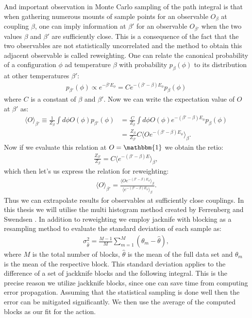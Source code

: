 \documentclass[english,twoside,openright]{UH_TCM_MSc}
\newcommand{\id}{\mathbbm{1}}
\begin{document}
And important observation in Monte Carlo sampling of the path integral is that when gathering numerous mounts of sample points for an observable $O_\beta$ at coupling $\beta$, one can imply information at $\beta'$ for an observable $O_{\beta'}$ when the two values $\beta$ and $\beta'$ are sufficiently close. This is a consequence of the fact that the two observables are not statistically uncorrelated and the method to obtain this adjacent observable is called reweighting. One can relate the canonical probability of a configuration $\phi$ ad temperature $\beta$ with probability $p_\beta(\phi)$ to its distribution at other temperatures $\beta'$:
\begin{align}
    p_{\beta'}(\phi) \propto e^{-\beta' E_\phi} = Ce^{-(\beta' - \beta)E_\phi} p_\beta(\phi)
\end{align}
where $C$ is a constant of $\beta$ and $\beta'$. Now we can write the expectation value of $O$ at $\beta'$ as:
\begin{align}
    \langle O \rangle_{\beta'} \equiv \frac{1}{Z_\beta}\int d\phi O(\phi) p_{\beta'}(\phi) &=  \frac{C}{Z_\beta}\int d\phi O(\phi) e^{-(\beta' - \beta)E_\phi} p_\beta(\phi) \\
    &= \frac{Z_\beta}{Z_{\beta'}}C\langle O e^{-(\beta'-\beta)E_\phi}\rangle_\beta.
\end{align}
Now if we evaluate this relation at $O=\id$ we obtain the retio:
\begin{align}
    \frac{Z_{\beta'}}{Z_\beta} = C\langle  e^{-(\beta'-\beta)E}\rangle_\beta,
\end{align}
which then let's us express the relation for reweighting:
\begin{align}
     \langle O \rangle_{\beta'} = \frac{\langle O e^{-(\beta'-\beta)E_\phi}\rangle_\beta}{\langle  e^{-(\beta'-\beta)E_\phi}\rangle_\beta}.
\end{align}
Thus we can extrapolate results for observables at sufficiently close couplings. In this thesis we will utilise the multi histogram method created by Ferrenberg and Swendsen \cite{FS-reweight}. In addition to reweighting we employ jacknife with blocking \cite[ch. 4.5.3]{gattringer2009quantum} as a resampling method to evaluate the standard deviation of each sample as:
\begin{align}
    \sigma^2_{\hat\theta} = \frac{M-1}{M}\sum_{m=1}^M(\theta_m - \hat\theta), \label{eq:error}
\end{align}
where $M$ is the total number of blocks, $\hat\theta$ is the mean of the full data set and $\theta_m$ is the mean of the respective block. This standard deviation applies to the difference of a set of jackknife blocks and the following integral. This is the precise reason we utilize jackknife blocks, since one can save time from computing error propagation. Assuming that the statistical sampling is done well then the error can be mitigated significantly. We then use the average of the computed blocks as our fit for the action. 
\end{document}
